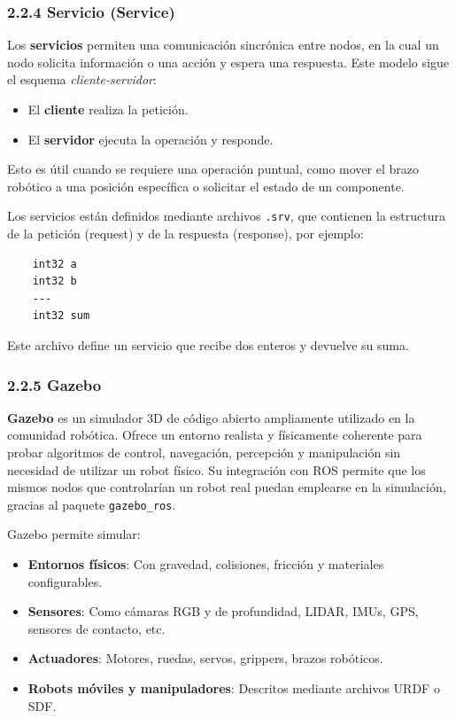 \subsubsection{2.2.4 Servicio (Service)}

Los \textbf{servicios} permiten una comunicación sincrónica entre nodos, en la cual un nodo solicita información o una acción y espera una respuesta. Este modelo sigue el esquema \textit{cliente-servidor}:

\begin{itemize}
	\item El \textbf{cliente} realiza la petición.
	\item El \textbf{servidor} ejecuta la operación y responde.
\end{itemize}

Esto es útil cuando se requiere una operación puntual, como mover el brazo robótico a una posición específica o solicitar el estado de un componente.

Los servicios están definidos mediante archivos \texttt{.srv}, que contienen la estructura de la petición (request) y de la respuesta (response), por ejemplo:

\begin{verbatim}
	int32 a
	int32 b
	---
	int32 sum
\end{verbatim}

Este archivo define un servicio que recibe dos enteros y devuelve su suma.

\subsubsection{2.2.5 Gazebo}

\textbf{Gazebo} es un simulador 3D de código abierto ampliamente utilizado en la comunidad robótica. Ofrece un entorno realista y físicamente coherente para probar algoritmos de control, navegación, percepción y manipulación sin necesidad de utilizar un robot físico. Su integración con ROS permite que los mismos nodos que controlarían un robot real puedan emplearse en la simulación, gracias al paquete \texttt{gazebo\_ros}.

Gazebo permite simular:
\begin{itemize}
	\item \textbf{Entornos físicos}: Con gravedad, colisiones, fricción y materiales configurables.
	\item \textbf{Sensores}: Como cámaras RGB y de profundidad, LIDAR, IMUs, GPS, sensores de contacto, etc.
	\item \textbf{Actuadores}: Motores, ruedas, servos, grippers, brazos robóticos.
	\item \textbf{Robots móviles y manipuladores}: Descritos mediante archivos URDF o SDF.
\end{itemize}

